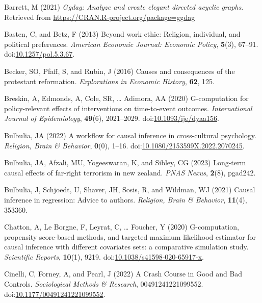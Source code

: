 \documentclass[
  singlecolumn,
  9pt]{article}
\begin{document}
\begin{CSLReferences}
Barrett, M (2021) \emph{Ggdag: Analyze and create elegant directed
acyclic graphs}. Retrieved from
\url{https://CRAN.R-project.org/package=ggdag}

Basten, C, and Betz, F (2013) Beyond work ethic: Religion, individual,
and political preferences. \emph{American Economic Journal: Economic
Policy}, \textbf{5}(3), 67--91.
doi:\href{https://doi.org/10.1257/pol.5.3.67}{10.1257/pol.5.3.67}.

Becker, SO, Pfaff, S, and Rubin, J (2016) Causes and consequences of the
protestant reformation. \emph{Explorations in Economic History},
\textbf{62}, 125.

Breskin, A, Edmonds, A, Cole, SR, \ldots{} Adimora, AA (2020)
G-computation for policy-relevant effects of interventions on
time-to-event outcomes. \emph{International Journal of Epidemiology},
\textbf{49}(6), 2021--2029.
doi:\href{https://doi.org/10.1093/ije/dyaa156}{10.1093/ije/dyaa156}.

Bulbulia, JA (2022) A workflow for causal inference in cross-cultural
psychology. \emph{Religion, Brain \& Behavior}, \textbf{0}(0), 1--16.
doi:\href{https://doi.org/10.1080/2153599X.2022.2070245}{10.1080/2153599X.2022.2070245}.

Bulbulia, JA, Afzali, MU, Yogeeswaran, K, and Sibley, CG (2023)
Long-term causal effects of far-right terrorism in new zealand.
\emph{PNAS Nexus}, \textbf{2}(8), pgad242.

Bulbulia, J, Schjoedt, U, Shaver, JH, Sosis, R, and Wildman, WJ (2021)
Causal inference in regression: Advice to authors. \emph{Religion, Brain
\& Behavior}, \textbf{11}(4), 353360.

Chatton, A, Le Borgne, F, Leyrat, C, \ldots{} Foucher, Y (2020)
G-computation, propensity score-based methods, and targeted maximum
likelihood estimator for causal inference with different covariates
sets: a comparative simulation study. \emph{Scientific Reports},
\textbf{10}(1), 9219.
doi:\href{https://doi.org/10.1038/s41598-020-65917-x}{10.1038/s41598-020-65917-x}.

Cinelli, C, Forney, A, and Pearl, J (2022) A Crash Course in Good and
Bad Controls. \emph{Sociological Methods \& Research},
00491241221099552.
doi:\href{https://doi.org/10.1177/00491241221099552}{10.1177/00491241221099552}.


\end{CSLReferences}
\end{document}

